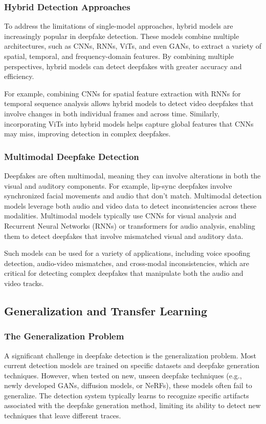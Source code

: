\documentclass[lettersize,journal]{IEEEtran}
\begin{document}
\subsubsection{Hybrid Detection Approaches}

To address the limitations of single-model approaches, hybrid models are increasingly popular in deepfake detection. These models combine multiple architectures, such as CNNs, RNNs, ViTs, and even GANs, to extract a variety of spatial, temporal, and frequency-domain features. By combining multiple perspectives, hybrid models can detect deepfakes with greater accuracy and efficiency.

For example, combining CNNs for spatial feature extraction with RNNs for temporal sequence analysis allows hybrid models to detect video deepfakes that involve changes in both individual frames and across time. Similarly, incorporating ViTs into hybrid models helps capture global features that CNNs may miss, improving detection in complex deepfakes.
\cite{elhag2025deep}

\subsubsection{Multimodal Deepfake Detection}

Deepfakes are often multimodal, meaning they can involve alterations in both the visual and auditory components. For example, lip-sync deepfakes involve synchronized facial movements and audio that don’t match. Multimodal detection models leverage both audio and video data to detect inconsistencies across these modalities. Multimodal models typically use CNNs for visual analysis and Recurrent Neural Networks (RNNs) or transformers for audio analysis, enabling them to detect deepfakes that involve mismatched visual and auditory data.

Such models can be used for a variety of applications, including voice spoofing detection, audio-video mismatches, and cross-modal inconsistencies, which are critical for detecting complex deepfakes that manipulate both the audio and video tracks.\cite{gupta2024spotting}

\subsection{Generalization and Transfer Learning}


\subsubsection{The Generalization Problem}
A significant challenge in deepfake detection is the generalization problem. Most current detection models are trained on specific datasets and deepfake generation techniques. However, when tested on new, unseen deepfake techniques (e.g., newly developed GANs, diffusion models, or NeRFs), these models often fail to generalize. The detection system typically learns to recognize specific artifacts associated with the deepfake generation method, limiting its ability to detect new techniques that leave different traces.
\end{document}
